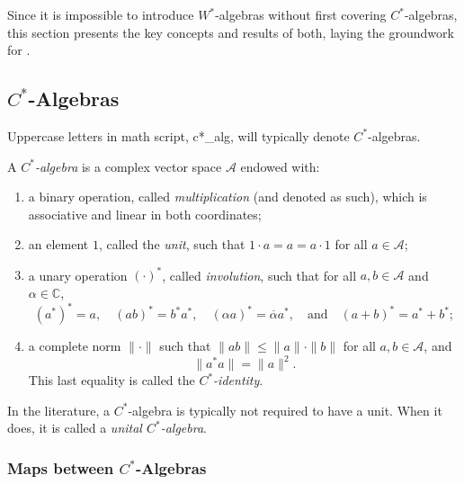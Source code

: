 Since it is impossible to introduce \( W^* \)-algebras without first covering \( C^* \)-algebras, this section presents the key concepts and results of both, laying the groundwork for .

\subsection{\( C^* \)-Algebras}

Uppercase letters in math script, \gls{c*_alg}, will typically denote $C^*$-algebras.


\begin{definition}
  A \emph{\( C^* \)-algebra} is a complex vector space \( \mathscr{A} \) endowed with:
\begin{enumerate}
    \item a binary operation, called \emph{multiplication} (and denoted as such), which is associative and linear in both coordinates;
    \item an element \( 1 \), called the \emph{unit}, such that \( 1 \cdot a = a = a \cdot 1 \) for all \( a \in \mathscr{A} \);
    \item a unary operation \( (\cdot)^* \), called \emph{involution}, such that for all \( a, b \in \mathscr{A} \) and \( \alpha \in \mathbb{C} \),
    \[
    (a^*)^* = a, \quad (ab)^* = b^* a^*, \quad (\alpha a)^* = \overline{\alpha} a^*, \quad \text{and} \quad (a + b)^* = a^* + b^*;
    \]
    \item a complete norm \( \|\cdot\| \) such that \( \| ab \| \leq \|a\| \cdot \|b\| \) for all \( a, b \in \mathscr{A} \), and
    \[
    \|a^* a\| = \|a\|^2.
    \]
    This last equality is called the \emph{\( C^* \)-identity}.
\end{enumerate}
\end{definition}


\begin{remark}  
  In the literature, a \( C^* \)-algebra is typically not required to have a unit. When it does, it is called a \emph{unital \( C^* \)-algebra}.
\end{remark}



\subsubsection{Maps between $C^*$-Algebras}

